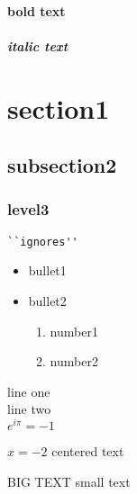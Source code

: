 \documentclass[10pt,a4paper]{article}
\begin{document}
\paragraph{\textbf{bold text}}
\paragraph{\textit{italic text}}
\section{section1}
\subsection{subsection2}
\subsubsection{level3}
\begin{verbatim}
``ignores''
\end{verbatim}
\begin{itemize}
\item bullet1
\item bullet2
\begin{enumerate}
\item number1
\item number2
\end{enumerate}
\end{itemize}
line one \\ line two \\
$e^{i \pi} = -1$
\begin{center}
$x=-2$
centered text
\end{center}
{\large BIG TEXT}
{\small small text}
\end{document}
